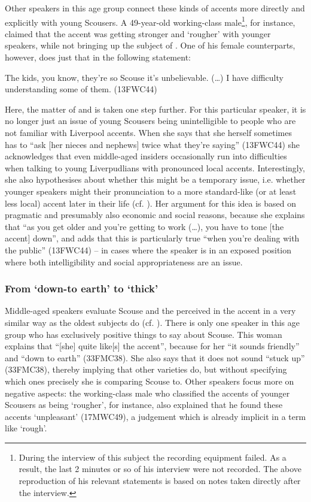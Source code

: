 Other speakers in this age group connect these kinds of accents more directly and explicitly with young Scousers.
A 49-year-old working-class male\footnote{During the interview of this subject the recording equipment failed. As a result, the last 2 minutes or so of his interview were not recorded. The above reproduction of his relevant statements is based on notes taken directly after the interview.}, for instance, claimed that the accent was getting stronger and `rougher' with younger speakers, while not bringing up the subject of .
One of his female counterparts, however, does just that in the following statement:
\begin{example}
	The kids, you know, they're so Scouse it's unbelievable. (\ldots) I have difficulty understanding some of them. (13FWC44)
\end{example}
Here, the matter of  and  is taken one step further.
For this particular speaker, it is no longer just an issue of young Scousers being unintelligible to people who are not familiar with Liverpool accents.
When she says that she herself sometimes has to ``ask [her nieces and nephews] twice what they're saying'' (13FWC44) she acknowledges that even middle-aged insiders occasionally run into difficulties when talking to young Liverpudlians with pronounced local accents.
Interestingly, she also hypothesises about whether this might be a temporary issue, i.e. whether younger speakers might  their pronunciation to a more standard-like (or at least less local) accent later in their life (cf. ).
Her argument for this idea is based on pragmatic and presumably also economic and social reasons, because she explains that ``as you get older and you're getting to work (\ldots), you have to tone [the accent] down'', and adds that this is particularly true ``when you're dealing with the public'' (13FWC44) -- in cases where the speaker is in an exposed position where both intelligibility and social appropriateness are an issue.

\subsubsection{From `down-to earth' to `thick'}
\label{aware_res.eval.mid.like}

Middle-aged speakers evaluate Scouse and the perceived  in the accent in a very similar way as the oldest subjects do (cf. ).
There is only one speaker in this age group who has exclusively positive things to say about Scouse.
This woman explains that ``[she] quite like[s] the accent'', because for her ``it sounds friendly'' and ``down to earth'' (33FMC38).
She also says that it does not sound ``stuck up'' (33FMC38), thereby implying that other varieties do, but without specifying which ones precisely she is comparing Scouse to.
Other speakers focus more on negative aspects: the working-class male who classified the accents of younger Scousers as being `rougher', for instance, also explained that he found these accents `unpleasant' (17MWC49), a judgement which is already implicit in a term like `rough'.

